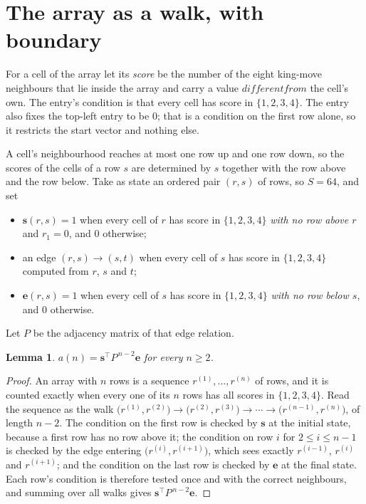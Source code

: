 \documentclass[11pt,a4paper]{article}
\theoremstyle{plain}
\newtheorem{lemma}[theorem]{Lemma}
\theoremstyle{definition}
\begin{document}
\section{The array as a walk, with boundary}

For a cell of the array let its \emph{score} be the number of the eight king-move neighbours that lie inside
the array and carry a value $different from$ the cell's own. The entry's condition is that every cell
has score in $\{1,2,3,4\}$. The entry also fixes the top-left entry to be $0$; that is a condition on the first row alone, so it restricts the start vector and nothing else.

A cell's neighbourhood reaches at most one row up and one row down, so the scores of the
cells of a row $s$ are determined by $s$ together with the row above and the row below.
Take as state an ordered pair $(r,s)$ of rows, so $S=64$, and set
\begin{itemize}
\item $\mathbf{s}(r,s)=1$ when every cell of $r$ has score in $\{1,2,3,4\}$ \emph{with no row
above $r$} and $r_1=0$, and $0$ otherwise;
\item an edge $(r,s)\to(s,t)$ when every cell of $s$ has score in $\{1,2,3,4\}$ computed from
$r$, $s$ and $t$;
\item $\mathbf{e}(r,s)=1$ when every cell of $s$ has score in $\{1,2,3,4\}$ \emph{with no row
below $s$}, and $0$ otherwise.
\end{itemize}
Let $P$ be the adjacency matrix of that edge relation.

\begin{lemma}\label{lem:walk}
$a(n)=\mathbf{s}^{\!\top}P^{\,n-2}\mathbf{e}$ for every $n\ge2$.
\end{lemma}

\begin{proof}
An array with $n$ rows is a sequence $r^{(1)},\dots,r^{(n)}$ of rows, and it is counted
exactly when every one of its $n$ rows has all scores in $\{1,2,3,4\}$. Read the sequence as the
walk $\bigl(r^{(1)},r^{(2)}\bigr)\to\bigl(r^{(2)},r^{(3)}\bigr)\to\cdots\to
\bigl(r^{(n-1)},r^{(n)}\bigr)$, of length $n-2$. The condition on the first row is
checked by $\mathbf{s}$ at the initial state, because a first row has no row above it; the
condition on row $i$ for $2\le i\le n-1$ is checked by the edge entering
$\bigl(r^{(i)},r^{(i+1)}\bigr)$, which sees exactly $r^{(i-1)}$, $r^{(i)}$ and
$r^{(i+1)}$; and the condition on the last row is checked by $\mathbf{e}$ at the final
state. Each row's condition is therefore tested once and with the correct neighbours, and
summing over all walks gives $\mathbf{s}^{\!\top}P^{\,n-2}\mathbf{e}$.
\end{proof}
\end{document}
